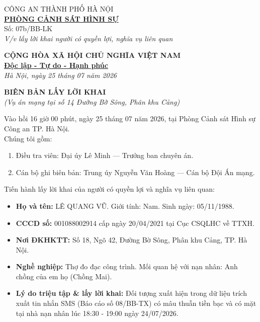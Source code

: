 \documentclass[12pt,a4paper]{article}
\begin{document}
\noindent
\begin{minipage}[t]{0.45\textwidth}
    \begin{center}
        \small
        CÔNG AN THÀNH PHỐ HÀ NỘI\\
        \textbf{\underline{PHÒNG CẢNH SÁT HÌNH SỰ}}\\[0.1cm]
        Số: 07b/BB-LK\\
        \textit{V/v lấy lời khai người có quyền lợi, nghĩa vụ liên quan}
    \end{center}
\end{minipage}
\hfill
\begin{minipage}[t]{0.52\textwidth}
    \begin{center}
        \small
        \textbf{CỘNG HÒA XÃ HỘI CHỦ NGHĨA VIỆT NAM}\\
        \textbf{\underline{Độc lập - Tự do - Hạnh phúc}}\\[0.1cm]
        \textit{Hà Nội, ngày 25 tháng 07 năm 2026}
    \end{center}
\end{minipage}

\vspace{0.6cm}

\begin{center}
    \textbf{\large BIÊN BẢN LẤY LỜI KHAI}\\
    \textit{(Vụ án mạng tại số 14 Đường Bờ Sông, Phân khu Cảng)}
\end{center}

\vspace{0.3cm}

\noindent Vào hồi 16 giờ 00 phút, ngày 25 tháng 07 năm 2026, tại Phòng Cảnh sát Hình sự Công an TP. Hà Nội.\\
Chúng tôi gồm:
\begin{enumerate}[label=\arabic*., leftmargin=1.5cm]
    \item Điều tra viên: Đại úy Lê Minh — Trưởng ban chuyên án.
    \item Cán bộ ghi biên bản: Trung úy Nguyễn Văn Hoàng — Cán bộ Đội Án mạng.
\end{enumerate}

\noindent Tiến hành lấy lời khai của người có quyền lợi và nghĩa vụ liên quan:
\begin{itemize}[leftmargin=1.5cm]
    \item \textbf{Họ và tên:} LÊ QUANG VŨ. Giới tính: Nam. Sinh ngày: 05/11/1988.
    \item \textbf{CCCD số:} 001088002914 cấp ngày 20/04/2021 tại Cục CSQLHC về TTXH.
    \item \textbf{Nơi ĐKHKTT:} Số 18, Ngõ 42, Đường Bờ Sông, Phân khu Cảng, TP. Hà Nội.
    \item \textbf{Nghề nghiệp:} Thợ đo đạc công trình. Mối quan hệ với nạn nhân: Anh chồng của em họ (Chồng Mai).
    \item \textbf{Lý do triệu tập \& lấy lời khai:} Đối tượng xuất hiện trong dữ liệu trích xuất tin nhắn SMS (Báo cáo số 08/BB-TX) có mâu thuẫn tiền bạc và có mặt tại nhà nạn nhân lúc 18:30 - 19:00 ngày 24/07/2026.
\end{itemize}
\end{document}
